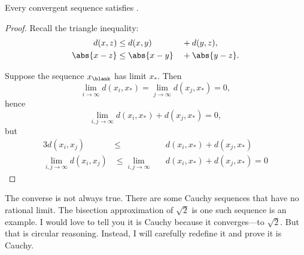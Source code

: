 \documentclass{scrartcl}
\newcommand{\dist}{d}
\begin{document}
\begin{theorem}
  Every convergent sequence satisfies .
\end{theorem}
\begin{proof}
  Recall the triangle inequality:
  \begin{alignat*}{3}
    \dist(x,z)&\leq d(x,y)&&+d(y,z),\\
    \abs{x-z}&\leq \abs{x-y}&&+\abs{y-z}.
  \end{alignat*}

  Suppose the sequence $x_{\blank}$ has limit $x_{*}$. Then
  \[
    \lim_{i\to\infty} \dist(x_{i},x_*) = \lim_{j\to\infty} \dist(x_{j},x_{*})=0,
  \]
  hence
  \[
    \lim_{i,j\to\infty} \dist(x_{i},x_{*})+\dist(x_{j},x_{*}) = 0,
  \]
  but
  \begin{alignat*}{3}
    \dist(x_{i},x_{j}) &\leq &&\dist(x_{i},x_{*}) + \dist(x_{j},x_{*}) \\
    \lim_{i,j\to \infty} \dist(x_{i},x_{j}) &\leq \lim_{i,j\to \infty} &&\dist(x_{i},x_{*})+\dist(x_{j},x_{*}) = 0
  \end{alignat*}
\end{proof}
The converse is not always true. There are some Cauchy sequences that have no rational limit. The bisection approximation of $\sqrt 2$ is one such sequence is an example. I would love to tell you it is Cauchy because it converges---to $\sqrt 2$. But that is circular reasoning. Instead, I will carefully redefine it and prove it is Cauchy.
\end{document}
